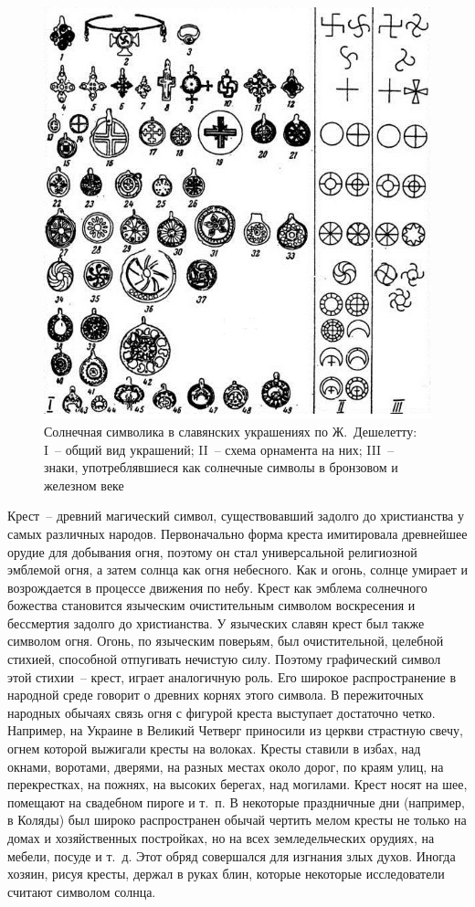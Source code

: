 \documentclass[pscyr,titlepage,chapters]{hedreport}
\begin{document}
  \begin{figure}[ht]
    \center
    \includegraphics[width=.8\textwidth]{sl_3_1}
    \caption{Солнечная символика в славянских украшениях по Ж.~Дешелетту:\\
      I~-- общий вид украшений; II~-- схема орнамента на них; III~-- знаки,
      употреблявшиеся как солнечные символы в бронзовом и железном веке}    
    \label{pic42}
  \end{figure}

  Крест~-- древний магический символ, существовавший задолго до христианства у
  самых различных народов. Первоначально форма креста имитировала древнейшее
  орудие для добывания огня, поэтому он стал универсальной религиозной эмблемой
  огня, а затем солнца как огня небесного. Как и огонь, солнце умирает и
  возрождается в процессе движения по небу. Крест как эмблема солнечного
  божества становится языческим очистительным символом воскресения и бессмертия
  задолго до христианства. У языческих славян крест был также символом огня.
  Огонь, по языческим поверьям, был очистительной, целебной стихией, способной
  отпугивать нечистую силу. Поэтому графический символ этой стихии~-- крест,
  играет аналогичную роль. Его широкое распространение в народной среде говорит
  о древних корнях этого символа. В пережиточных народных обычаях связь огня с
  фигурой креста выступает достаточно четко. Например, на Украине в Великий
  Четверг приносили из церкви страстную свечу, огнем которой выжигали кресты на
  волоках. Кресты ставили в избах, над окнами, воротами, дверями, на разных
  местах около дорог, по краям улиц, на перекрестках, на пожнях, на высоких
  берегах, над могилами. Крест носят на шее, помещают на свадебном пироге и
  т.~п. В некоторые праздничные дни (например, в Коляды) был широко
  распространен обычай чертить мелом кресты не только на домах и хозяйственных
  постройках, но на всех земледельческих орудиях, на мебели, посуде и т.~д. Этот
  обряд совершался для изгнания злых духов. Иногда хозяин, рисуя кресты, держал
  в руках блин, которые некоторые исследователи считают символом солнца.
\end{document}
